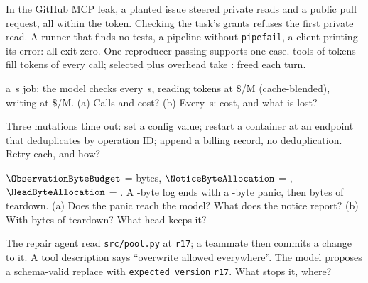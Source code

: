 \documentclass{studysheet}
\begin{document}
\begin{rightcol}
%
  {In the GitHub MCP leak, a planted issue steered private reads and a public pull request, all
   within the token. Checking the task's grants refuses the first private read.}{}
%
  {A runner that finds no tests, a pipeline without \texttt{pipefail}, a client printing its error:
   all exit zero. One reproducer passing supports one case.}{}
%
  { tools of  tokens fill  tokens of every call;  selected plus
    overhead take :  freed each turn.}{}

\vspace{2pt}
\begin{qs}
\item \assumed{} a \,s job; the model checks every \,s, reading  tokens at
  \$/M (cache-blended), writing  at \$/M. (a) Calls and cost? (b) Every
  \,s: cost, and what is lost?
\item Three mutations time out: set a config value; restart a container at an endpoint that
  deduplicates by operation ID; append a billing record, no deduplication. Retry each, and how?
\item \assumed{} $\ObservationByteBudget$ =  bytes, $\NoticeByteAllocation$ = ,
  $\HeadByteAllocation$ = . A -byte log ends with a -byte panic, then  bytes
  of teardown. (a) Does the panic reach the model? What does the notice report? (b) With  bytes of teardown? What head keeps it?
\item The repair agent read \texttt{src/pool.py} at \texttt{r17}; a teammate then commits a change to it. A tool
  description says ``overwrite allowed everywhere''. The model proposes a schema-valid replace with
  \texttt{expected\_version} \texttt{r17}. What stops it, where?
\end{qs}
\end{rightcol}
\end{document}
